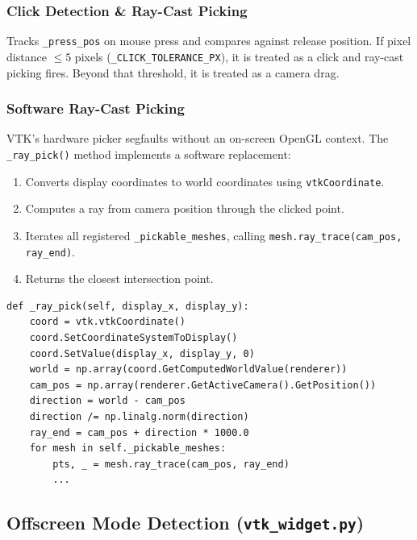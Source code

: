 \documentclass[11pt,a4paper]{article}
\begin{document}
\subsubsection{Click Detection \& Ray-Cast Picking}

Tracks \texttt{\_press\_pos} on mouse press and compares against release position. If pixel distance $\leq 5$ pixels (\texttt{\_CLICK\_TOLERANCE\_PX}), it is treated as a click and ray-cast picking fires. Beyond that threshold, it is treated as a camera drag.

\subsubsection{Software Ray-Cast Picking}

VTK's hardware picker segfaults without an on-screen OpenGL context. The \texttt{\_ray\_pick()} method implements a software replacement:

\begin{enumerate}[nosep]
    \item Converts display coordinates to world coordinates using \texttt{vtkCoordinate}.
    \item Computes a ray from camera position through the clicked point.
    \item Iterates all registered \texttt{\_pickable\_meshes}, calling \texttt{mesh.ray\_trace(cam\_pos, ray\_end)}.
    \item Returns the closest intersection point.
\end{enumerate}

\begin{lstlisting}
def _ray_pick(self, display_x, display_y):
    coord = vtk.vtkCoordinate()
    coord.SetCoordinateSystemToDisplay()
    coord.SetValue(display_x, display_y, 0)
    world = np.array(coord.GetComputedWorldValue(renderer))
    cam_pos = np.array(renderer.GetActiveCamera().GetPosition())
    direction = world - cam_pos
    direction /= np.linalg.norm(direction)
    ray_end = cam_pos + direction * 1000.0
    for mesh in self._pickable_meshes:
        pts, _ = mesh.ray_trace(cam_pos, ray_end)
        ...
\end{lstlisting}

\subsection{Offscreen Mode Detection (\texttt{vtk\_widget.py})}
\end{document}
